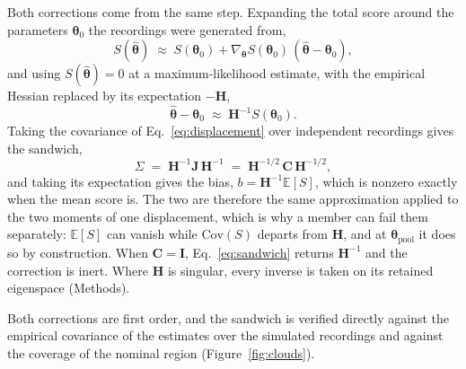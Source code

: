 \begin{appendixbox}
Both corrections come from the same step. Expanding the total score around the parameters
$\bm{\theta}_0$ the recordings were generated from,
\begin{equation}
  S(\hat{\bm{\theta}}) \;\approx\; S(\bm{\theta}_0)
    + \nabla_{\bm{\theta}} S(\bm{\theta}_0)\,(\hat{\bm{\theta}}-\bm{\theta}_0),
  \label{eq:score-expansion}
\end{equation}
and using $S(\hat{\bm{\theta}})=0$ at a maximum-likelihood estimate, with the empirical Hessian
replaced by its expectation $-\mathbf{H}$,
\begin{equation}
  \hat{\bm{\theta}}-\bm{\theta}_0 \;\approx\; \mathbf{H}^{-1}S(\bm{\theta}_0).
  \label{eq:displacement}
\end{equation}
Taking the covariance of Eq.~\ref{eq:displacement} over independent recordings gives the sandwich,
\begin{equation}
  \Sigma \;=\; \mathbf{H}^{-1}\mathbf{J}\,\mathbf{H}^{-1}
   \;=\; \mathbf{H}^{-1/2}\,\mathbf{C}\,\mathbf{H}^{-1/2},
  \label{eq:sandwich}
\end{equation}
and taking its expectation gives the bias, $b=\mathbf{H}^{-1}\mathbb{E}[S]$, which is nonzero
exactly when the mean score is. The two are therefore the same approximation applied to the two
moments of one displacement, which is why a member can fail them separately: $\mathbb{E}[S]$ can
vanish while $\mathrm{Cov}(S)$ departs from $\mathbf{H}$, and at $\bm{\theta}_{\mathrm{pool}}$ it
does so by construction. When $\mathbf{C}=\mathbf{I}$, Eq.~\ref{eq:sandwich} returns
$\mathbf{H}^{-1}$ and the correction is inert. Where $\mathbf{H}$ is singular, every inverse is
taken on its retained eigenspace (Methods).

Both corrections are first order, and the sandwich is verified directly against the empirical
covariance of the estimates over the simulated recordings and against the coverage of the nominal
region (Figure~\ref{fig:clouds}).


\end{appendixbox}
